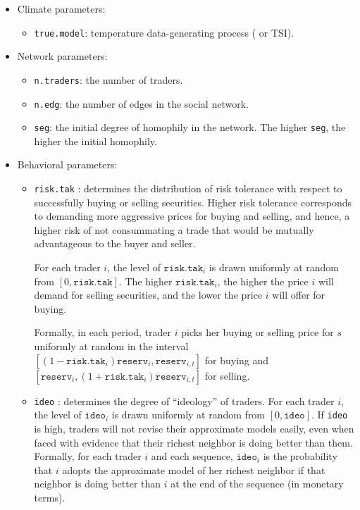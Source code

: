 \documentclass{wscpaperproc}\usepackage[]{graphicx}\usepackage[]{color}
\begin{document}
\begin{itemize}
  \item Climate parameters:
  \begin{itemize}
    \item  \texttt{true.model}: temperature data-generating process ( or TSI).
  \end{itemize}
  
  \item Network parameters:
  \begin{itemize}
    \item  \texttt{n.traders}: the number of traders.
    \item  \texttt{n.edg}: the number of edges in the social network.
    \item  \texttt{seg}: the initial degree of homophily in the network. 
    The higher  \texttt{seg}, the higher the initial homophily. 
  \end{itemize}
    
  \item Behavioral parameters:
  \begin{itemize}
    \item  \texttt{risk.tak} : determines the distribution of risk tolerance with respect to successfully buying or selling securities.     Higher risk tolerance corresponds to demanding more aggressive prices for buying and selling, and hence, a higher risk of not consummating a trade that would be mutually advantageous to the buyer and seller.
    
    For each trader $i$, the level of $\texttt{risk.tak}_i$ is drawn uniformly at random from $[0,\texttt{risk.tak}]$.
    The higher $\texttt{risk.tak}_i$, the higher the price $i$ will demand for selling securities, and the lower the price $i$ will offer for buying.
    
    Formally, in each period, trader $i$ picks her buying or selling price for $s$ uniformly at random in the interval  
    $[(1 - \texttt{risk.tak}_i) \texttt{reserv}_{i}, \allowbreak  \texttt{reserv}_{i,t}]$ for buying and 
    $[\texttt{reserv}_{i}, \allowbreak (1  + \texttt{risk.tak}_i) \texttt{reserv}_{i,t}]$ for selling. 
  
  \item  \texttt{ideo} :  determines the degree of ``ideology'' of traders.
    For each trader $i$, the level of $\texttt{ideo}_i$ is drawn uniformly at random from $[0,\texttt{ideo}]$.
    If \texttt{ideo} is high, traders will not revise their approximate models easily, even when faced with evidence that their richest neighbor is doing better than them. 
    Formally, for each trader $i$ and each sequence, $\texttt{ideo}_i$ is the probability that $i$ adopts the approximate model of her richest neighbor if that neighbor is doing better than $i$ at the end of the sequence (in monetary terms).
  \end{itemize}
\end{itemize}
\end{document}
